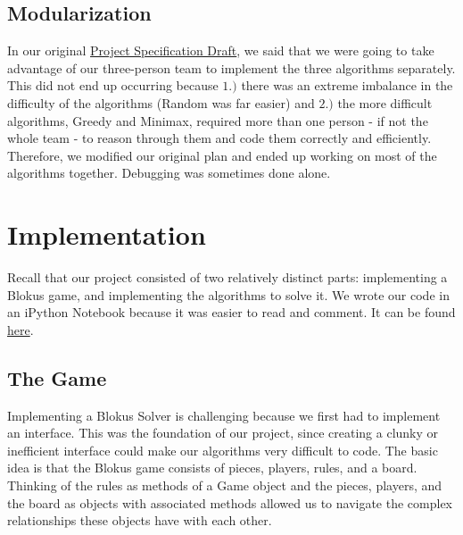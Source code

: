 \documentclass[11pt]{article}
\begin{document}
\subsection{Modularization}

In our original \href{run:report/Final Project Specification (Draft).pdf}{Project Specification Draft}, we said that we were going to take advantage of our three-person team to implement the three algorithms separately. This did not end up occurring because $1.)$ there was an extreme imbalance in the difficulty of the algorithms (Random was far easier) and $2.)$ the more difficult algorithms, Greedy and Minimax, required more than one person - if not the whole team - to reason through them and code them correctly and efficiently. Therefore, we modified our original plan and ended up working on most of the algorithms together. Debugging was sometimes done alone.


\pagebreak


\section{Implementation}

Recall that our project consisted of two relatively distinct parts: implementing a Blokus game, and implementing the algorithms to solve it. We wrote our code in an iPython Notebook because it was easier to read and comment. It can be found \href{http://nbviewer.ipython.org/github/yuanjiang/blokus_solver/blob/master/Blokus\%20Solver.ipynb}{here}.

\subsection{The Game}

Implementing a Blokus Solver is challenging because we first had to implement an interface. This was the foundation of our project, since creating a clunky or inefficient interface could make our algorithms very difficult to code. The basic idea is that the Blokus game consists of pieces, players, rules, and a board. Thinking of the rules as methods of a Game object and the pieces, players, and the board as objects with associated methods allowed us to navigate the complex relationships these objects have with each other.

\bigskip
\end{document}
